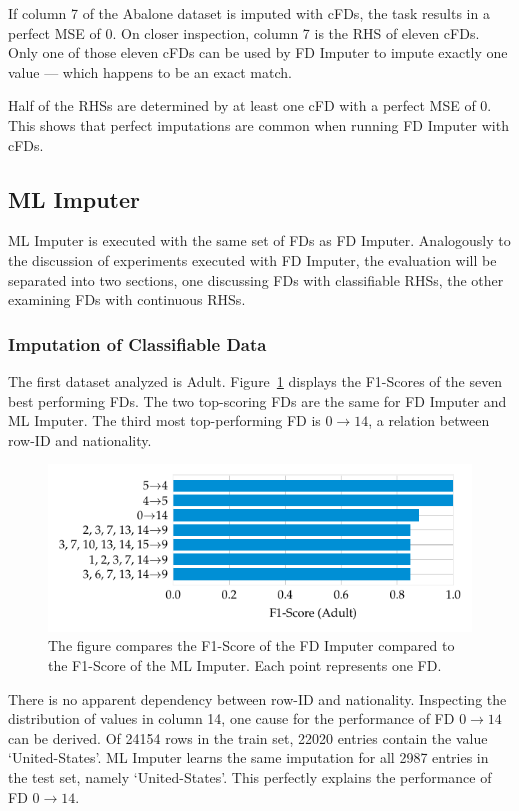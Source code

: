 If column 7 of the Abalone dataset is imputed with cFDs, the task results in a perfect MSE of 0.
On closer inspection, column 7 is the RHS of eleven cFDs.
Only one of those eleven cFDs can be used by FD Imputer to impute exactly one value --- which happens to be an exact match.

Half of the RHSs are determined by at least one cFD with a perfect MSE of 0.
This shows that perfect imputations are common when running FD Imputer with cFDs.

\subsection{ML Imputer}
ML Imputer is executed with the same set of FDs as FD Imputer.
Analogously to the discussion of experiments executed with FD Imputer, the evaluation will be separated into two sections, one discussing FDs with classifiable RHSs, the other examining FDs with continuous RHSs.

\subsubsection{Imputation of Classifiable Data}
The first dataset analyzed is Adult.
Figure~\ref{fig:f1_ml_adult} displays the F1-Scores of the seven best performing FDs.
The two top-scoring FDs are the same for FD Imputer and ML Imputer.
The third most top-performing FD is \( 0 \rightarrow 14\), a relation between row-ID and nationality.
\begin{figure}[ht]
     \centering
     \includegraphics[width=\textwidth]{../figures/adult/f1_ml_imputer.pdf}
     \caption{The figure compares the F1-Score of the FD Imputer compared to the F1-Score of the ML Imputer. Each point represents one FD.}
     \label{fig:f1_ml_adult}
 \end{figure}
There is no apparent dependency between row-ID and nationality.
Inspecting the distribution of values in column 14, one cause for the performance of FD \( 0 \rightarrow 14 \) can be derived.
Of 24154 rows in the train set, 22020 entries contain the value `United-States'.
ML Imputer learns the same imputation for all 2987 entries in the test set, namely `United-States'.
This perfectly explains the performance of FD \( 0 \rightarrow 14\).

